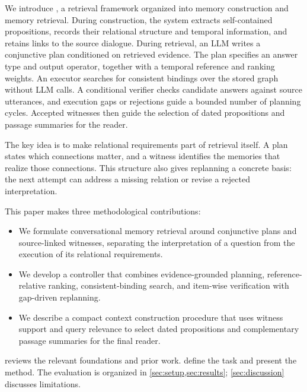 We introduce \sys, a retrieval framework organized into memory
construction and memory retrieval. During construction, the system
extracts self-contained propositions, records their relational
structure and temporal information, and retains links to the source
dialogue. During retrieval, an \ac{LLM} writes a conjunctive plan
conditioned on retrieved evidence. The plan specifies an answer type
and output operator, together with a temporal reference and ranking
weights. An executor searches for consistent bindings over the stored
graph without \ac{LLM} calls. A conditional verifier checks candidate
answers against source utterances, and execution gaps or rejections
guide a bounded number of planning cycles. Accepted witnesses then
guide the selection of dated propositions and passage summaries for
the reader.

The key idea is to make relational requirements part of retrieval
itself. A plan states which connections matter, and a witness identifies
the memories that realize those connections. This structure also gives
replanning a concrete basis: the next attempt can address a missing
relation or revise a rejected interpretation.

This paper makes three methodological contributions:
\begin{itemize}
  \item We formulate conversational memory retrieval around conjunctive
    plans and source-linked witnesses, separating the interpretation
    of a question from the execution of its relational requirements.
  \item We develop a controller that combines evidence-grounded planning,
    reference-relative ranking, consistent-binding search, and
    item-wise verification with gap-driven replanning.
  \item We describe a compact context construction procedure that uses
    witness support and query relevance to select dated propositions
    and complementary passage summaries for the final reader.
\end{itemize}

 reviews the relevant foundations and prior work.
 define the task and present the method.
The evaluation is organized in \cref{sec:setup,sec:results};
\cref{sec:discussion} discusses limitations.
